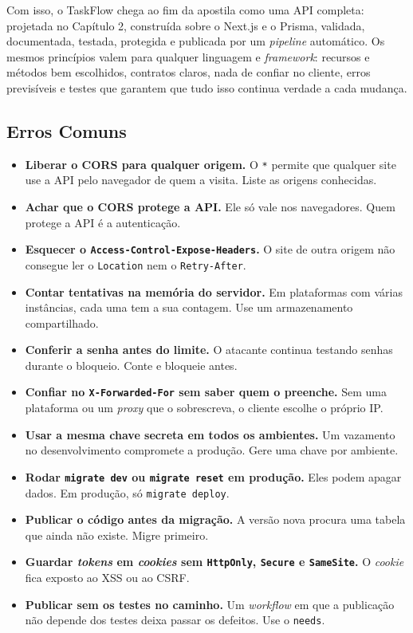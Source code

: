 Com isso, o TaskFlow chega ao fim da apostila como uma API completa: projetada no Capítulo 2, construída sobre o Next.js e o Prisma, validada, documentada, testada, protegida e publicada por um \textit{pipeline} automático. Os mesmos princípios valem para qualquer linguagem e \textit{framework}: recursos e métodos bem escolhidos, contratos claros, nada de confiar no cliente, erros previsíveis e testes que garantem que tudo isso continua verdade a cada mudança.

\subsection{Erros Comuns}

\begin{itemize}
  \item \textbf{Liberar o CORS para qualquer origem.} O \texttt{*} permite que qualquer site use a API pelo navegador de quem a visita. Liste as origens conhecidas.
  \item \textbf{Achar que o CORS protege a API.} Ele só vale nos navegadores. Quem protege a API é a autenticação.
  \item \textbf{Esquecer o \texttt{Access-Control-Expose-Headers}.} O site de outra origem não consegue ler o \texttt{Location} nem o \texttt{Retry-After}.
  \item \textbf{Contar tentativas na memória do servidor.} Em plataformas com várias instâncias, cada uma tem a sua contagem. Use um armazenamento compartilhado.
  \item \textbf{Conferir a senha antes do limite.} O atacante continua testando senhas durante o bloqueio. Conte e bloqueie antes.
  \item \textbf{Confiar no \texttt{X-Forwarded-For} sem saber quem o preenche.} Sem uma plataforma ou um \textit{proxy} que o sobrescreva, o cliente escolhe o próprio IP.
  \item \textbf{Usar a mesma chave secreta em todos os ambientes.} Um vazamento no desenvolvimento compromete a produção. Gere uma chave por ambiente.
  \item \textbf{Rodar \texttt{migrate dev} ou \texttt{migrate reset} em produção.} Eles podem apagar dados. Em produção, só \texttt{migrate deploy}.
  \item \textbf{Publicar o código antes da migração.} A versão nova procura uma tabela que ainda não existe. Migre primeiro.
  \item \textbf{Guardar \textit{tokens} em \textit{cookies} sem \texttt{HttpOnly}, \texttt{Secure} e \texttt{SameSite}.} O \textit{cookie} fica exposto ao XSS ou ao CSRF.
  \item \textbf{Publicar sem os testes no caminho.} Um \textit{workflow} em que a publicação não depende dos testes deixa passar os defeitos. Use o \texttt{needs}.
\end{itemize}
